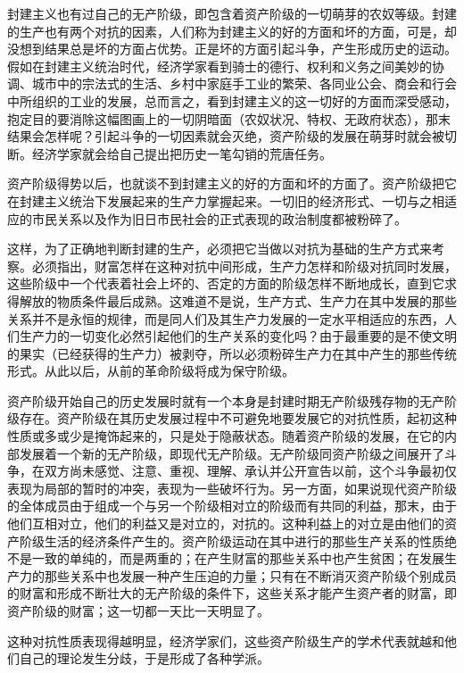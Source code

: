\documentclass[a4paper,twoside,12pt,AutoFakeBold]{ctexart}
\begin{document}
封建主义也有过自己的无产阶级，即包含着资产阶级的一切萌芽的农奴等级。封建的生产也有两个对抗的因素，人们称为封建主义的好的方面和坏的方面，可是，却没想到结果总是坏的方面占优势。正是坏的方面引起斗争，产生形成历史的运动。假如在封建主义统治时代，经济学家看到骑士的德行、权利和义务之间美妙的协调、城市中的宗法式的生活、乡村中家庭手工业的繁荣、各同业公会、商会和行会中所组织的工业的发展，总而言之，看到封建主义的这一切好的方面而深受感动，抱定目的要消除这幅图画上的一切阴暗面（农奴状况、特权、无政府状态），那末结果会怎样呢？引起斗争的一切因素就会灭绝，资产阶级的发展在萌芽时就会被切断。经济学家就会给自己提出把历史一笔勾销的荒唐任务。

资产阶级得势以后，也就谈不到封建主义的好的方面和坏的方面了。资产阶级把它在封建主义统治下发展起来的生产力掌握起来。一切旧的经济形式、一切与之相适应的市民关系以及作为旧日市民社会的正式表现的政治制度都被粉碎了。

这样，为了正确地判断封建的生产，必须把它当做以对抗为基础的生产方式来考察。必须指出，财富怎样在这种对抗中间形成，生产力怎样和阶级对抗同时发展，这些阶级中一个代表着社会上坏的、否定的方面的阶级怎样不断地成长，直到它求得解放的物质条件最后成熟。这难道不是说，生产方式、生产力在其中发展的那些关系并不是永恒的规律，而是同人们及其生产力发展的一定水平相适应的东西，人们生产力的一切变化必然引起他们的生产关系的变化吗？由于最重要的是不使文明的果实（已经获得的生产力）被剥夺，所以必须粉碎生产力在其中产生的那些传统形式。从此以后，从前的革命阶级将成为保守阶级。

资产阶级开始自己的历史发展时就有一个本身是封建时期无产阶级残存物的无产阶级存在。资产阶级在其历史发展过程中不可避免地要发展它的对抗性质，起初这种性质或多或少是掩饰起来的，只是处于隐蔽状态。随着资产阶级的发展，在它的内部发展着一个新的无产阶级，即现代无产阶级。无产阶级同资产阶级之间展开了斗争，在双方尚未感觉、注意、重视、理解、承认并公开宣告以前，这个斗争最初仅表现为局部的暂时的冲突，表现为一些破坏行为。另一方面，如果说现代资产阶级的全体成员由于组成一个与另一个阶级相对立的阶级而有共同的利益，那末，由于他们互相对立，他们的利益又是对立的，对抗的。这种利益上的对立是由他们的资产阶级生活的经济条件产生的。资产阶级运动在其中进行的那些生产关系的性质绝不是一致的单纯的，而是两重的；在产生财富的那些关系中也产生贫困；在发展生产力的那些关系中也发展一种产生压迫的力量；只有在不断消灭资产阶级个别成员的财富和形成不断壮大的无产阶级的条件下，这些关系才能产生资产者的财富，即资产阶级的财富；这一切都一天比一天明显了。

这种对抗性质表现得越明显，经济学家们，这些资产阶级生产的学术代表就越和他们自己的理论发生分歧，于是形成了各种学派。
\end{document}
